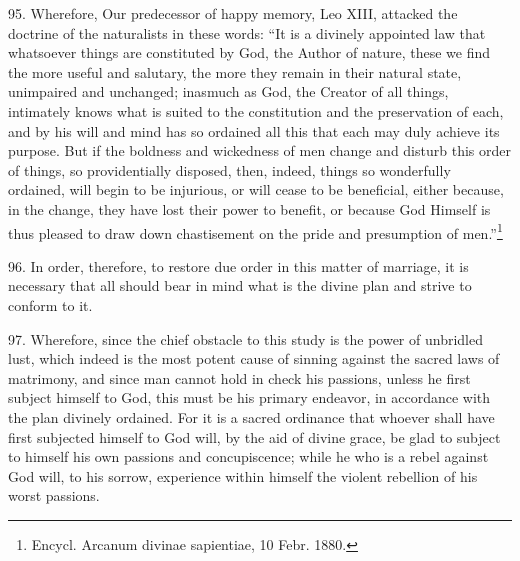 \documentclass[12pt,a4paper]{book}
\begin{document}
95. Wherefore, Our predecessor of happy memory, Leo XIII, attacked the doctrine of the naturalists in these words: ``It is a divinely appointed law that whatsoever things are constituted by God, the Author of nature, these we find the more useful and salutary, the more they remain in their natural state, unimpaired and unchanged; inasmuch as God, the Creator of all things, intimately knows what is suited to the constitution and the preservation of each, and by his will and mind has so ordained all this that each may duly achieve its purpose. But if the boldness and wickedness of men change and disturb this order of things, so providentially disposed, then, indeed, things so wonderfully ordained, will begin to be injurious, or will cease to be beneficial, either because, in the change, they have lost their power to benefit, or because God Himself is thus pleased to draw down chastisement on the pride and presumption of men.''\footnote{Encycl. Arcanum divinae sapientiae, 10 Febr. 1880.}

96. In order, therefore, to restore due order in this matter of marriage, it is necessary that all should bear in mind what is the divine plan and strive to conform to it.

97. Wherefore, since the chief obstacle to this study is the power of unbridled lust, which indeed is the most potent cause of sinning against the sacred laws of matrimony, and since man cannot hold in check his passions, unless he first subject himself to God, this must be his primary endeavor, in accordance with the plan divinely ordained. For it is a sacred ordinance that whoever shall have first subjected himself to God will, by the aid of divine grace, be glad to subject to himself his own passions and concupiscence; while he who is a rebel against God will, to his sorrow, experience within himself the violent rebellion of his worst passions.
\end{document}
